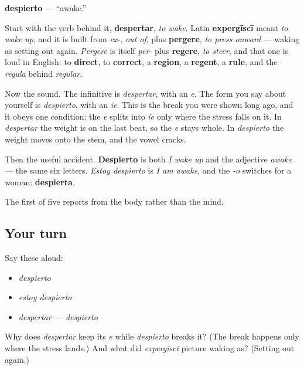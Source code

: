 \begin{cousinweb}
\textbf{despierto} — \textquotedblleft{}awake.\textquotedblright{}

Start with the verb behind it, \textbf{despertar}, \emph{to wake}. Latin \textbf{expergīscī} meant \emph{to wake up}, and it is built from \emph{ex-}, \emph{out of}, plus \textbf{pergere}, \emph{to press onward} — waking as setting out again. \emph{Pergere} is itself \emph{per-} plus \textbf{regere}, \emph{to steer}, and that one is loud in English: to \textbf{direct}, to \textbf{correct}, a \textbf{region}, a \textbf{regent}, a \textbf{rule}, and the \emph{regula} behind \emph{regular}.

Now the sound. The infinitive is \emph{despertar}, with an \emph{e}. The form you say about yourself is \emph{despierto}, with an \emph{ie}. This is the break you were shown long ago, and it obeys one condition: the \emph{e} splits into \emph{ie} only where the stress falls on it. In \emph{despertar} the weight is on the last beat, so the \emph{e} stays whole. In \emph{despierto} the weight moves onto the stem, and the vowel cracks.

Then the useful accident. \textbf{Despierto} is both \emph{I wake up} and the adjective \emph{awake} — the same six letters. \emph{Estoy despierto} is \emph{I am awake}, and the \emph{-o} switches for a woman: \textbf{despierta}.
\end{cousinweb}

\begin{grammarlens}[title={What you've built}]
The first of five reports from the body rather than the mind.
\end{grammarlens}

\subsection*{Your turn}
Say these aloud:

\begin{itemize}
\raggedright
  \item \emph{despierto}
  \item \emph{estoy despierto}
  \item \emph{despertar — despierto}
\end{itemize}

\begin{tcolorbox}[breakable,colback=teal!4,colframe=teal!35!black,title={Before you move on}]
Why does \emph{despertar} keep its \emph{e} while \emph{despierto} breaks it? (The break happens only where the stress lands.) And what did \emph{expergīscī} picture waking as? (Setting out again.)
\end{tcolorbox}
